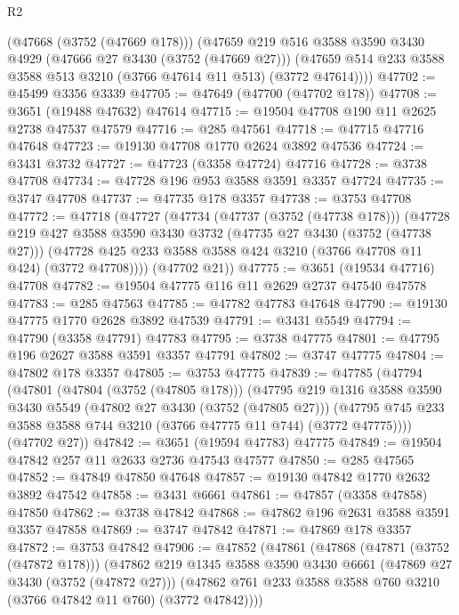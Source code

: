 \begin{lexlean}{R2}
\begin{coremodule}
      (@47668 (@3752 (@47669 @178)))
      (@47659
        @219
        @516
        @3588
        @3590
        @3430
        @4929
        (@47666 @27 @3430 (@3752 (@47669 @27)))
        (@47659 @514 @233 @3588 @3588 @513 @3210 (@3766 @47614 @11 @513) (@3772 @47614))))
@47702 := @45499 @3356 @3339
@47705 := @47649 (@47700 (@47702 @178))
@47708 := @3651 (@19488 @47632) @47614
@47715 := @19504 @47708 @190 @11 @2625 @2738 @47537 @47579
@47716 := @285 @47561
@47718 := @47715 @47716 @47648
@47723 := @19130 @47708 @1770 @2624 @3892 @47536
@47724 := @3431 @3732
@47727 := @47723 (@3358 @47724) @47716
@47728 := @3738 @47708
@47734 := @47728 @196 @953 @3588 @3591 @3357 @47724
@47735 := @3747 @47708
@47737 := @47735 @178 @3357
@47738 := @3753 @47708
@47772 := @47718
    (@47727
      (@47734
        (@47737 (@3752 (@47738 @178)))
        (@47728
          @219
          @427
          @3588
          @3590
          @3430
          @3732
          (@47735 @27 @3430 (@3752 (@47738 @27)))
          (@47728 @425 @233 @3588 @3588 @424 @3210 (@3766 @47708 @11 @424) (@3772 @47708))))
      (@47702 @21))
@47775 := @3651 (@19534 @47716) @47708
@47782 := @19504 @47775 @116 @11 @2629 @2737 @47540 @47578
@47783 := @285 @47563
@47785 := @47782 @47783 @47648
@47790 := @19130 @47775 @1770 @2628 @3892 @47539
@47791 := @3431 @5549
@47794 := @47790 (@3358 @47791) @47783
@47795 := @3738 @47775
@47801 := @47795 @196 @2627 @3588 @3591 @3357 @47791
@47802 := @3747 @47775
@47804 := @47802 @178 @3357
@47805 := @3753 @47775
@47839 := @47785
    (@47794
      (@47801
        (@47804 (@3752 (@47805 @178)))
        (@47795
          @219
          @1316
          @3588
          @3590
          @3430
          @5549
          (@47802 @27 @3430 (@3752 (@47805 @27)))
          (@47795 @745 @233 @3588 @3588 @744 @3210 (@3766 @47775 @11 @744) (@3772 @47775))))
      (@47702 @27))
@47842 := @3651 (@19594 @47783) @47775
@47849 := @19504 @47842 @257 @11 @2633 @2736 @47543 @47577
@47850 := @285 @47565
@47852 := @47849 @47850 @47648
@47857 := @19130 @47842 @1770 @2632 @3892 @47542
@47858 := @3431 @6661
@47861 := @47857 (@3358 @47858) @47850
@47862 := @3738 @47842
@47868 := @47862 @196 @2631 @3588 @3591 @3357 @47858
@47869 := @3747 @47842
@47871 := @47869 @178 @3357
@47872 := @3753 @47842
@47906 := @47852
    (@47861
      (@47868
        (@47871 (@3752 (@47872 @178)))
        (@47862
          @219
          @1345
          @3588
          @3590
          @3430
          @6661
          (@47869 @27 @3430 (@3752 (@47872 @27)))
          (@47862 @761 @233 @3588 @3588 @760 @3210 (@3766 @47842 @11 @760) (@3772 @47842))))

\end{coremodule}
\end{lexlean}
